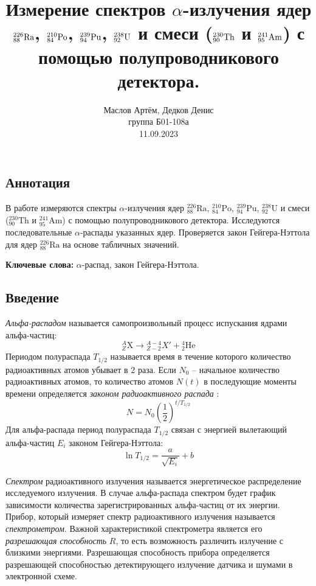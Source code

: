 \documentclass[10pt,a4paper]{article}
\author{\normalsize Маслов Артём, Дедков Денис \\
	\normalsize группа Б01-108а \\
	\normalsize 11.09.2023}
\date{}
\title{
	\Large Измерение спектров $\alpha$-излучения ядер $\Ra$, $\Po$, $\Pu$, $\Ua$ и смеси ($\Th$ и $\Am$) с помощью полупроводникового детектора. \\ 
}
\newcommand{\elem}[3]{{}^{#2}_{#3}\text{#1}}
\newcommand{\Ra}{\elem{Ra}{226}{88}}
\newcommand{\Pu}{\elem{Pu}{239}{94}}
\newcommand{\Po}{\elem{Po}{210}{84}}
\newcommand{\Ua}{\elem{U}{238}{92}}
\newcommand{\Th}{\elem{Th}{230}{90}}
\newcommand{\Am}{\elem{Am}{241}{95}}
\begin{document}
\maketitle
\begin{multicols}{2}
	
	\subsection*{Аннотация}
	
	В работе измеряются спектры $\alpha$-излучения ядер $\Ra$, $\Po$, $\Pu$, $\Ua$ и смеси ($\Th$ и $\Am$) с помощью полупроводникового детектора. Исследуются последовательные $\alpha$-распады указанных ядер. Проверяется закон Гейгера-Нэттола для ядер $\Ra$ на основе табличных значений.
	
	\textbf{Ключевые слова:} $\alpha$-распад, закон Гейгера-Нэттола.
	
	\subsection*{Введение}
	\textit{Альфа-распадом} называется самопроизвольный процесс испускания ядрами альфа-частиц:
	$$
	\elem{X}{A}{Z} \rightarrow \elem{$X'$}{A-4}{Z-2} + \elem{He}{4}{2}
	$$
	Периодом полураспада $T_{1/2}$ называется время в течение которого количество радиоактивных атомов убывает в 2 раза. Если $N_0$ -- начальное количество радиоактивных атомов, то количество атомов $N(t)$ в последующие моменты времени определяется \textit{законом радиоактивного распада} \cite[$\S 73$]{Sivukhin5}:
	$$
	N = N_0  \left(\frac{1}{2}\right)^{t / T_{1/2}}
	$$
	Для альфа-распада период полураспада $T_{1/2}$ связан с энергией вылетающий альфа-частиц $E_i$ законом Гейгера-Нэттола:
	\begin{equation}
		\ln T_{1/2} = \frac{a}{\sqrt{E_i}} + b
		\label{eq:geiger_nuttall_law}
	\end{equation}
	
	\textit{Спектром} радиоактивного излучения называется энергетическое распределение исследуемого излучения. В случае альфа-распада спектром будет график зависимости количества зарегистрированных альфа-частиц от их энергии. Прибор, который измеряет спектр радиоактивного излучения называется \textit{спектрометром}. Важной характеристикой спектрометра является его \textit{разрешающая способность} $R$, то есть возможность различить излучение с близкими энергиями. Разрешающая способность прибора определяется разрешающей способностью детектирующего излучение датчика и шумами в электронной схеме.
	

\end{multicols}
\end{document}

